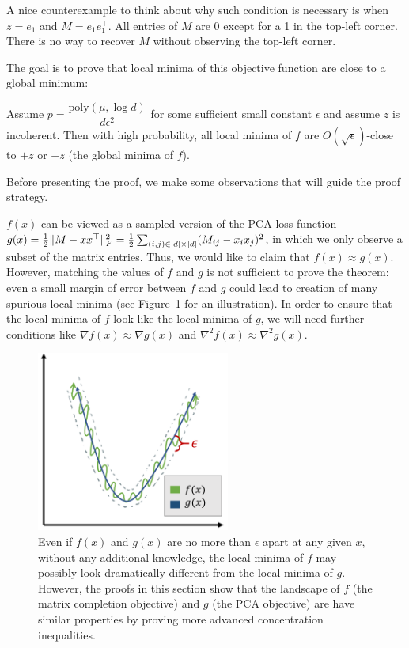 \begin{remark}
A nice counterexample to think about why such condition is necessary is when $z = e_1$ and $M = e_1 e_1^\top$. All entries of $M$ are 0 except for a 1 in the top-left corner. There is no way to recover $M$ without observing the top-left corner.
\end{remark}

The goal is to prove that local minima of this objective function are close to a global minimum:

\begin{theorem}\label{lec11:thm:matrix-completion}
Assume $p = \dfrac{\textrm{poly}(\mu, \log d)}{d\epsilon^2}$ for some sufficient small constant $\epsilon$ and assume $z$ is incoherent. Then with high probability, all local minima of $f$ are $O(\sqrt{\epsilon})$-close to $+z$ or $-z$ (the global minima of $f$).
\end{theorem}

Before presenting the proof, we make some observations that will guide the proof strategy.

\begin{remark}
$f(x)$ can be viewed as a sampled version of the PCA loss function $g(x) = \frac{1}{2}\|M - xx^\top\|_F^2 = \frac{1}{2}\sum_{(i,j) \in [d]\times[d]} (M_{ij} - x_ix_j)^2$, in which we only observe a subset of the matrix entries. Thus, we would like to claim that $f(x) \approx g(x)$. However, matching the values of $f$ and $g$ is not sufficient to prove the theorem: even a small margin of error between $f$ and $g$ could lead to creation of many spurious local minima (see Figure~\ref{lec11:fig:matrix_completion_f_g} for an illustration). In order to ensure that the local minima of $f$ look like the local minima of $g$, we will need further conditions like $\nabla f(x) \approx \nabla g(x)$ and $\nabla^2 f(x) \approx \nabla^2 g(x)$.
\end{remark}

\begin{figure}
    \centering
    \includegraphics[width=2.5in]{figures/matrix-completion-f-g.png}
    \caption{Even if $f(x)$ and $g(x)$ are no more than $\epsilon$ apart at any given $x$, without any additional knowledge, the local minima of $f$ may possibly look dramatically different from the local minima of $g$. However, the proofs in this section show that the landscape of $f$ (the matrix completion objective) and $g$ (the PCA objective) are have similar properties by proving more advanced concentration inequalities. }
    \label{lec11:fig:matrix_completion_f_g}
\end{figure}


